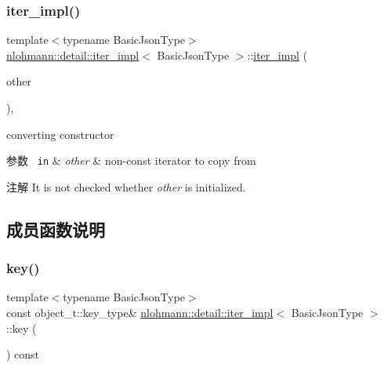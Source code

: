 \subsubsection{\texorpdfstring{iter\_impl()}{iter\_impl()}\hspace{0.1cm}{\footnotesize\ttfamily [4/4]}}
{\footnotesize\ttfamily template$<$typename Basic\+Json\+Type$>$ \\
\mbox{\hyperlink{classnlohmann_1_1detail_1_1iter__impl}{nlohmann\+::detail\+::iter\+\_\+impl}}$<$ Basic\+Json\+Type $>$\+::\mbox{\hyperlink{classnlohmann_1_1detail_1_1iter__impl}{iter\+\_\+impl}} (\begin{DoxyParamCaption}\item[{const \mbox{\hyperlink{classnlohmann_1_1detail_1_1iter__impl}{iter\+\_\+impl}}$<$ typename std\+::remove\+\_\+const$<$ Basic\+Json\+Type $>$\+::type $>$ \&}]{other }\end{DoxyParamCaption})\hspace{0.3cm}{\ttfamily [inline]}, {\ttfamily [noexcept]}}



converting constructor 


\begin{DoxyParams}[1]{参数}
\mbox{\texttt{ in}}  & {\em other} & non-\/const iterator to copy from \\
\hline
\end{DoxyParams}
\begin{DoxyNote}{注解}
It is not checked whether {\itshape other} is initialized. 
\end{DoxyNote}


\subsection{成员函数说明}
\mbox{\label{classnlohmann_1_1detail_1_1iter__impl_a15dfb2744fed2ef40c12a9e9a20d6dbc}} 
\subsubsection{\texorpdfstring{key()}{key()}}
{\footnotesize\ttfamily template$<$typename Basic\+Json\+Type$>$ \\
const object\+\_\+t\+::key\+\_\+type\& \mbox{\hyperlink{classnlohmann_1_1detail_1_1iter__impl}{nlohmann\+::detail\+::iter\+\_\+impl}}$<$ Basic\+Json\+Type $>$\+::key (\begin{DoxyParamCaption}{ }\end{DoxyParamCaption}) const\hspace{0.3cm}{\ttfamily [inline]}}



